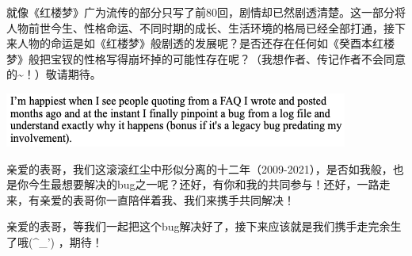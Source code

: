 \documentclass[9pt, b5paper]{article}
\begin{document}
就像《红楼梦》广为流传的部分只写了前80回，剧情却已然剧透清楚。这一部分将人物前世今生、性格命运、不同时期的成长、生活环境的格局已经全部打通，接下来人物的命运是如《红楼梦》般剧透的发展呢？是否还存在任何如《癸酉本红楼梦》般把宝钗的性格写得崩坏掉的可能性存在呢？（我想作者、传记作者不会同意的\textasciitilde{}！）敬请期待。

\begin{center}
\includegraphics[width=.9\linewidth]{./pic/backups_plans_20210418_000054.png}
\end{center}

亲爱的表哥，我们这滚滚红尘中形似分离的十二年（2009-2021），是否如我般，也是你今生最想要解决的bug之一呢？还好，有你和我的共同参与！还好，一路走来，有亲爱的表哥你一直陪伴着我、我们来携手共同解决！

亲爱的表哥，等我们一起把这个bug解决好了，接下来应该就是我们携手走完余生了哦(\^{}\_') ，期待！
\end{document}
